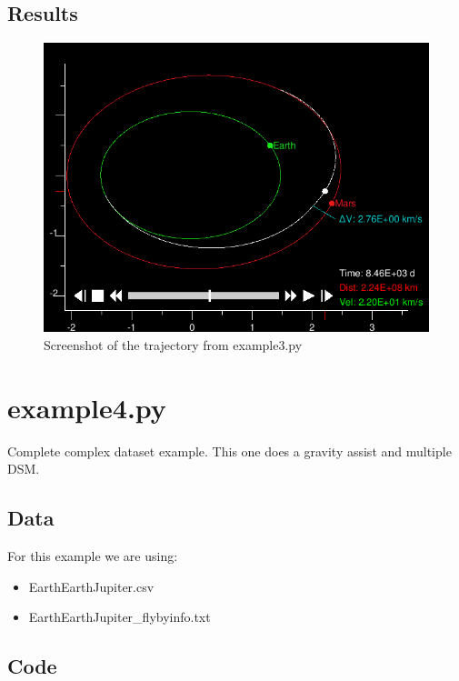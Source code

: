 \documentclass[a4paper,11pt]{article}
\begin{document}
\subsection{Results}
\begin{figure}[H]
\centering
\includegraphics[width=1\textwidth]{img/example3}
\caption{Screenshot of the trajectory from example3.py}
\label{img:example3}
\end{figure}


\newpage
\section{example4.py}
Complete complex dataset example. This one does a gravity assist and multiple \gls{DSM}.
\subsection{Data}
For this example we are using:

\begin{itemize}
\item EarthEarthJupiter.csv
\item EarthEarthJupiter\_flybyinfo.txt
\end{itemize}
\subsection{Code}

\end{document}
